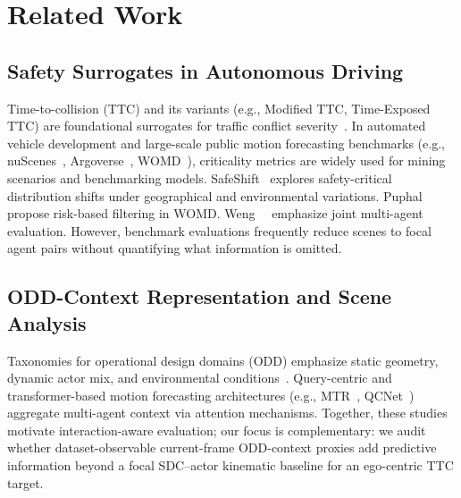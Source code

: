 \section{Related Work}
\label{sec:related}

\subsection{Safety Surrogates in Autonomous Driving}
Time-to-collision (TTC) and its variants (e.g., Modified TTC, Time-Exposed TTC) are foundational surrogates for traffic conflict severity~\cite{hayward1972near,minderhoud2001extended,laureshyn2010surrogate,westhofen2023criticality}. In automated vehicle development and large-scale public motion forecasting benchmarks (e.g., nuScenes~\cite{caesar2020nuscenes}, Argoverse~\cite{chang2019argoverse}, WOMD~\cite{ettinger2021large}), criticality metrics are widely used for mining scenarios and benchmarking models. SafeShift~\cite{stoler2024safeshift} explores safety-critical distribution shifts under geographical and environmental variations. Puphal~\etal~\cite{puphal2025risk} propose risk-based filtering in WOMD. Weng~\etal~\cite{weng2023joint} emphasize joint multi-agent evaluation. However, benchmark evaluations frequently reduce scenes to focal agent pairs without quantifying what information is omitted.

\subsection{ODD-Context Representation and Scene Analysis}
Taxonomies for operational design domains (ODD) emphasize static geometry, dynamic actor mix, and environmental conditions~\cite{koopman2017challenges,iso34503,saej3016,ulbrich2015defining}. Query-centric and transformer-based motion forecasting architectures (e.g., MTR~\cite{shi2022motion}, QCNet~\cite{zhou2023query}) aggregate multi-agent context via attention mechanisms. Together, these studies motivate interaction-aware evaluation; our focus is complementary: we audit whether dataset-observable current-frame ODD-context proxies add predictive information beyond a focal SDC--actor kinematic baseline for an ego-centric TTC target.
